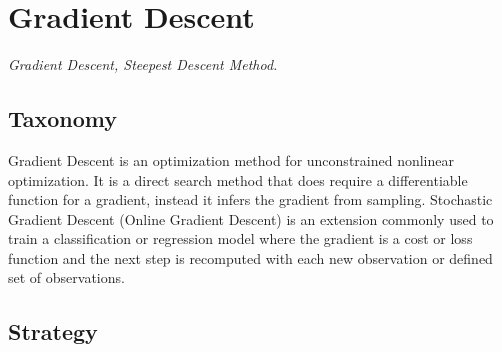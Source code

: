 
\section{Gradient Descent} 
\label{sec:gradient_descent}

\emph{Gradient Descent, Steepest Descent Method.}

\subsection{Taxonomy}
Gradient Descent is an optimization method for unconstrained nonlinear optimization.
It is a direct search method that does require a differentiable function for a gradient, instead it infers the gradient from sampling.
Stochastic Gradient Descent (Online Gradient Descent) is an extension commonly used to train a classification or regression model where the gradient is a cost or loss function and the next step is recomputed with each new observation or defined set of observations.


\subsection{Strategy}


